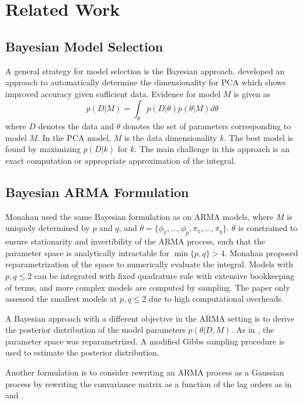 
\section{Related Work}

\subsection{Bayesian Model Selection}

A general strategy for model selection is the Bayesian approach. \cite{minka2000} developed an approach to automatically determine the dimensionality for PCA which shows improved accuracy given sufficient data. Evidence for model $M$ is given as
$$p(D|M) = \int_\theta p(D|\theta)p(\theta|M) d\theta$$
where $D$ denotes the data and $\theta$ denotes the set of parameters corresponding to model $M$. In the PCA model, $M$ is the data dimensionality $k$. The best model is found by maximizing $p(D|k)$ for $k$. The main challenge in this approach is an exact computation or appropriate approximation of the integral.

\subsection{Bayesian ARMA Formulation}
Monahan used the same Bayesian formulation as \cite{minka2000} on ARMA models, where $M$ is uniquely determined by $p$ and $q$, and $\theta=\{\phi_1,\dots,\phi_p,\pi_1,\dots,\pi_q\}$. \cite{monahan1982} $\theta$ is constrained to ensure stationarity and invertibility of the ARMA process, such that the parameter space is analytically intractable for $\min\{p,q\}>4$. Monahan proposed reparametrization of the space to numerically evaluate the integral. Models with $p,q\leq 2$ can be integrated with fixed quadrature rule with extensive bookkeeping of terms, and more complex models are computed by sampling. The paper only assessed the smallest models at $p,q\leq 2$ due to high computational overheads. 

A Bayesian approach with a different objective in the ARMA setting is to derive the posterior distribution of the model parameters $p(\theta|D,M)$. \cite{marriott1993} As in \cite{monahan1982}, the parameter space was reparametrized. A modified Gibbs sampling procedure is used to estimate the posterior distribution.

Another formulation is to consider rewriting an ARMA process as a Gaussian process by rewriting the convariance matrix as a function of the lag orders as in \cite{davis2006} and \cite{rasmussen2005}.  

